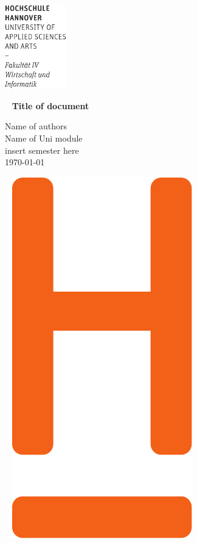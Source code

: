 \documentclass[12pt,DIV14,BCOR10mm,a4paper,parskip=half-,headsepline,headinclude,english,ngerman,bibliography=totocnumbered]{scrreprt}
\newcommand{\documentTitle}{Title of document}
\newcommand{\authorName}{Name of authors}
\newcommand{\uniModuleName}{Name of Uni module}
\newcommand{\semester}{insert semester here}
\begin{document}
\thispagestyle{empty}
\includegraphics[width=0.2\textwidth]{Wortmarke_WI_schwarz}

   {  ~ \sffamily
  \vfill
  {\Huge\bfseries \documentTitle}
  \bigskip

  {\Large
  \authorName \\[2ex]
  \uniModuleName \\[0.5ex]
  \semester
  \\[5ex]
  \today }
}
 \vfill

  ~ \hfill
  \includegraphics[height=0.3\paperheight]{H_WI_Pantone1665}

\vspace*{-3cm}

\end{document}
